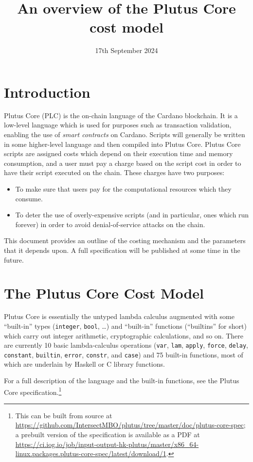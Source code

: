\documentclass[a4paper]{article}
\title{An overview of the Plutus Core cost model\\
}
\date{17th September 2024}
\begin{document}
\maketitle

\section{Introduction}
Plutus Core (PLC) is the on-chain language of the Cardano blockchain.  It is a
low-level language which is used for purposes such as transaction validation,
enabling the use of \textit{smart contracts} on Cardano.  Scripts will generally
be written in some higher-level language and then compiled into Plutus Core.
Plutus Core scripts are assigned costs which depend on their execution time and
memory consumption, and a user must pay a charge based on the script cost in
order to have their script executed on the chain.  These charges have two
purposes:

\begin{itemize}
\item To make sure that users pay for the computational resources which they consume.
\item To deter the use of overly-expensive scripts (and in particular, ones
  which run forever) in order to avoid denial-of-service attacks on the chain.
\end{itemize}

\noindent This document provides an outline of the costing mechanism and the
parameters that it depends upon.  A full specification will be published at some
time in the future.


\section{The Plutus Core Cost Model}
Plutus Core is essentially the untyped lambda calculus augmented with some
``built-in'' types (\texttt{integer}, \texttt{bool}, \ldots) and ``built-in''
functions (``builtins'' for short) which carry out integer arithmetic,
cryptographic calculations, and so on.  There are currently 10 basic
lambda-calculus operations (\texttt{var}, \texttt{lam}, \texttt{apply},
\texttt{force}, \texttt{delay}, \texttt{constant}, \texttt{builtin},
\texttt{error}, \texttt{constr}, and \texttt{case}) and 75 built-in
functions, most of which are underlain by Haskell or C library functions.

For a full description of the language and the built-in functions, see the
Plutus Core specification.\footnote{This can be built from source at
\url{https://github.com/IntersectMBO/plutus/tree/master/doc/plutus-core-spec}; a
prebuilt version of the specification is available as a PDF at
\url{https://ci.iog.io/job/input-output-hk-plutus/master/x86_64-linux.packages.plutus-core-spec/latest/download/1}.}
\end{document}
